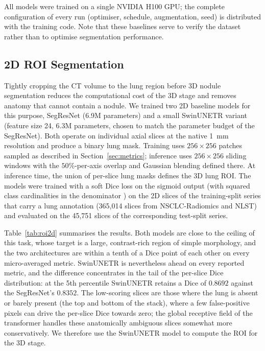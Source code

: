All models were trained on a single NVIDIA H100 GPU; the complete configuration of every run (optimiser, schedule, augmentation, seed) is distributed with the training code.
Note that these baselines serve to verify the dataset rather than to optimise segmentation performance.

\subsection{2D ROI Segmentation}
Tightly cropping the CT volume to the lung region before 3D nodule segmentation reduces the computational cost of the 3D stage and removes anatomy that cannot contain a nodule. We trained two 2D baseline models for this purpose, SegResNet \cite{Myronenko2019} (6.9M parameters) and a small SwinUNETR \cite{Hatamizadeh2022} variant (feature size 24, 6.3M parameters, chosen to match the parameter budget of the SegResNet).
Both operate on individual axial slices at the native 1~mm resolution and produce a binary lung mask.
Training uses $256 \times 256$ patches sampled as described in Section~\ref{sec:metrics}; inference uses $256 \times 256$ sliding windows with the $50\%$-per-axis overlap and Gaussian blending defined there.
At inference time, the union of per-slice lung masks defines the 3D lung ROI.
The models were trained with a soft Dice loss on the sigmoid output (with squared class cardinalities in the denominator \cite{Milletari2016}) on the 2D slices of the training-split series that carry a lung annotation (365,014 slices from NSCLC-Radiomics and NLST) and evaluated on the 45,751 slices of the corresponding test-split series.

Table~\ref{tab:roi2d} summarises the results. Both models are close to the ceiling of this task, whose target is a large, contrast-rich region of simple morphology, and the two architectures are within a tenth of a Dice point of each other on every micro-averaged metric. SwinUNETR is nevertheless ahead on every reported metric, and the difference concentrates in the tail of the per-slice Dice distribution: at the 5th percentile SwinUNETR retains a Dice of $0.8692$ against the SegResNet's $0.8352$. The low-scoring slices are those where the lung is absent or barely present (the top and bottom of the stack), where a few false-positive pixels can drive the per-slice Dice towards zero; the global receptive field of the transformer handles these anatomically ambiguous slices somewhat more conservatively. We therefore use the SwinUNETR model to compute the ROI for the 3D stage.


